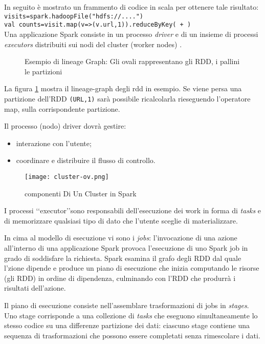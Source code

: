 In seguito è mostrato un frammento di codice in scala per ottenere tale
risultato:\\
\texttt{visits=spark.hadoopFile("hdfs://....")}\\
\texttt{val counts=visit.map(v=>(v.url,1)).reduceByKey( + )}\\

Una applicazione Spark consiste in un processo \textit{driver} e di un insieme di processi \textit{executors} distribuiti sui nodi del cluster (worker nodes) .
\begin{figure}[htbp]
    \caption{Esempio di lineage Graph: Gli ovali rappresentano gli RDD, i pallini le partizioni}
    \label{fig:lineageRDD}
\end{figure}

La figura \ref{fig:lineageRDD} mostra il lineage-graph degli rdd in esempio. Se
viene persa una partizione dell'RDD \texttt{(URL,1)} sarà possibile ricalcolarla
rieseguendo l'operatore map, sulla corrispondente partizione.



Il processo (nodo)   driver dovrà gestire:
\begin{itemize}
\item interazione con l'utente;
\item coordinare e distribuire il flusso di controllo.
\end{itemize}


\begin{figure}[h]
\centering
\texttt{[image: cluster-ov.png]}
\caption{componenti Di Un Cluster in Spark}
\label{fig:sparkClusterComponents}
\end{figure} 
 
I processi \lq\lq executor\rq\rq sono responsabili dell'esecuzione dei work in forma di \textit{tasks} e di memorizzare qualsiasi tipo di dato che l'utente sceglie di materializzare. 

In cima al modello di esecuzione vi sono i \textit{jobs}: l'invocazione di una azione all'interno di una applicazione Spark provoca l'esecuzione di uno Spark job in grado di soddisfare la richiesta. Spark esamina il grafo degli RDD dal quale l'zione dipende e produce un piano di esecuzione che inizia computando le risorse (gli RDD) in ordine di dipendenza, culminando con l'RDD che produrrà i risultati dell'azione.
 

Il piano di esecuzione consiste nell'assemblare trasformazioni di jobs in \textit{stages}. Uno stage corrisponde a una collezione di \textit{tasks} che eseguono simultaneamente lo stesso codice su una differenze partizione dei dati: ciascuno stage contiene una sequenza di trasformazioni che possono essere completati senza rimescolare i dati.


